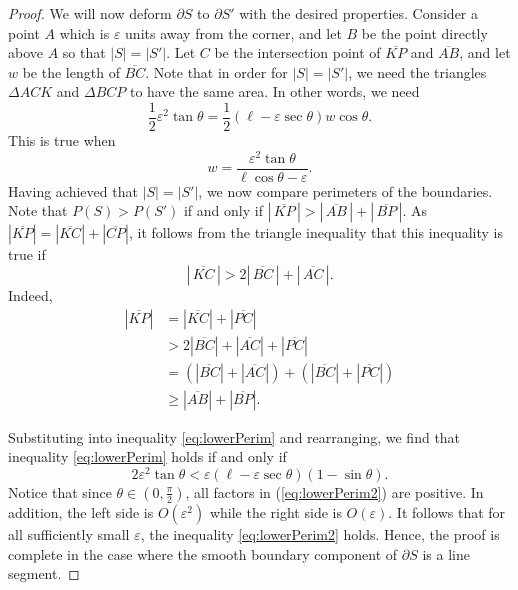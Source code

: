 \documentclass[10pt,a4paper]{amsart}
\begin{document}
\begin{proof}
    We will now deform $\partial S$ to $\partial S'$ with the desired properties. Consider a point $A$ which is $\varepsilon$ units away from the corner, and let $B$ be the point directly above $A$ so that $|S| = |S'|$. Let $C$ be the intersection point of $\overline{KP}$ and $\overline{AB}$, and let $w$ be the length of $\overline{BC}$. Note that in order for $|S| = |S'|$, we need the triangles $\Delta ACK$ and $\Delta BCP$ to have the same area. In other words, we need $$\frac{1}{2}\varepsilon^2 \tan\theta = \frac{1}{2}(\ell - \varepsilon\sec\theta)w\cos\theta.$$ This is true when
    \[
        w = \frac{\varepsilon^2\tan\theta}{\ell\cos\theta - \varepsilon}.
    \]
    Having achieved that $|S| = |S'|$, we now compare perimeters of the boundaries.  Note that $P(S) > P(S')$ if and only if $\left|\,\overline{KP}\,\right| > \left|\,\overline{AB}\,\right| + \left|\,\overline{BP}\,\right|.$
    As $|\overline{KP}|  = |\overline{KC}| + |\overline{CP}|$, it follows from the triangle inequality that this inequality is true if
    \begin{equation}\label{eq:lowerPerim}
        \left|\,\overline{KC}\,\right| > 
        2\left|\,\overline{BC}\,\right| + 
        \left|\,\overline{AC}\,\right|.
    \end{equation}
    Indeed, \begin{align*} |\overline{KP}| &= |\overline{KC}|+|\overline{PC}|\\
    & > 2|\overline{BC}| +|\overline{AC}| + |\overline{PC}|\\
    &= (|\overline{BC}| + |\overline{AC}|) + (|\overline{BC}| + |\overline{PC}|)\\
    & \geq |\overline{AB}| + |\overline{BP}|.\end{align*}
    
    Substituting into inequality \eqref{eq:lowerPerim} and rearranging, we find that inequality \eqref{eq:lowerPerim} holds if and only if 
    \begin{equation}\label{eq:lowerPerim2}
        2\varepsilon^2\tan\theta < \varepsilon(\ell - \varepsilon\sec\theta)(1-\sin\theta).
    \end{equation}
    Notice that since $\theta \in (0,\tfrac{\pi}{2})$, all factors in (\ref{eq:lowerPerim2}) are positive.  In addition, the left side is $O(\varepsilon^2)$ while the right side is $O(\varepsilon)$.  It follows that for all sufficiently small $\varepsilon$, the inequality \eqref{eq:lowerPerim2} holds. Hence, the proof is complete in the case where the smooth boundary component of $\partial S$ is a line segment.


\end{proof}
\end{document}
